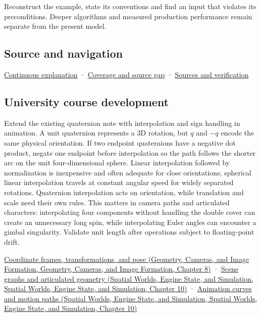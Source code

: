 Reconstruct the example, state its conventions and find an input that violates its preconditions. Deeper algorithms and measured production performance remain separate from the present model.

\subsection{Source and navigation}\label{appendix-8e61ab68f6b2-source-and-navigation}

\hyperref[01-foundations-i-ch018-keep-the-promises-visible-while-moving-between-representations]{Continuous explanation} · \hyperref[appendix-fd090d982a15-phase-7---parts-601-700]{Coverage and source gap} · \hyperref[appendix-a103e7846d21-phase-7---source-analysis-and-verification]{Sources and verification}

\subsection{University course development}\label{appendix-8e61ab68f6b2-university-course-development}

Extend the existing quaternion note with interpolation and sign handling in animation. A unit quaternion represents a 3D rotation, but \(q\) and \(-q\) encode the same physical orientation. If two endpoint quaternions have a negative dot product, negate one endpoint before interpolation so the path follows the shorter arc on the unit four-dimensional sphere. Linear interpolation followed by normalization is inexpensive and often adequate for close orientations; spherical linear interpolation travels at constant angular speed for widely separated rotations. Quaternion interpolation acts on orientation, while translation and scale need their own rules. This matters in camera paths and articulated characters: interpolating four components without handling the double cover can create an unnecessary long spin, while interpolating Euler angles can encounter a gimbal singularity. Validate unit length after operations subject to floating-point drift.

\href{../03-Geometry-Cameras-and-Image-Formation/main.pdf\#nameddest=03-visual-computing-i-ch001-coordinate-frames-transformations-and-pose}{Coordinate frames, transformations, and pose (Geometry, Cameras, and Image Formation, Geometry, Cameras, and Image Formation, Chapter 8)} · \href{../05-Spatial-Worlds-Engine-State-and-Simulation/main.pdf\#nameddest=04-visual-computing-ii-ch029-scene-graphs-and-articulated-geometry}{Scene graphs and articulated geometry (Spatial Worlds, Engine State, and Simulation, Spatial Worlds, Engine State, and Simulation, Chapter 10)} · \href{../05-Spatial-Worlds-Engine-State-and-Simulation/main.pdf\#nameddest=04-visual-computing-ii-ch029-animation-curves-and-motion-paths}{Animation curves and motion paths (Spatial Worlds, Engine State, and Simulation, Spatial Worlds, Engine State, and Simulation, Chapter 10)}
